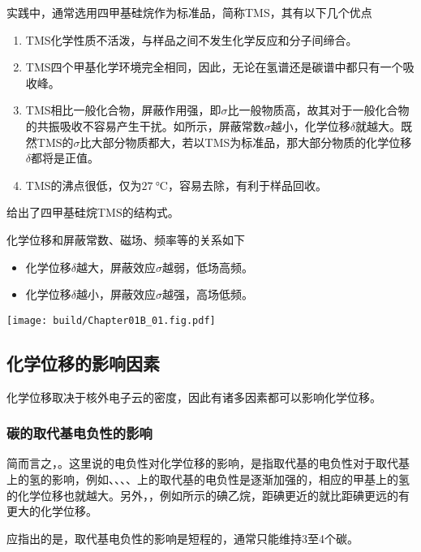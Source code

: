 实践中，通常选用四甲基硅烷作为标准品，简称TMS，其有以下几个优点
\begin{enumerate}
    \item TMS化学性质不活泼，与样品之间不发生化学反应和分子间缔合。
    \item TMS四个甲基化学环境完全相同，因此，无论在氢谱还是碳谱中都只有一个吸收峰。
    \item TMS相比一般化合物，屏蔽作用强，即$\sigma$比一般物质高，故其对于一般化合物的共振吸收不容易产生干扰。如所示，屏蔽常数$\sigma$越小，化学位移$\delta$就越大。既然TMS的$\sigma$比大部分物质都大，若以TMS为标准品，那大部分物质的化学位移$\delta$都将是正值。
    \item TMS的沸点很低，仅为$\SI{27}{\degreeCelsius}$，容易去除，有利于样品回收。
\end{enumerate}\goodbreak

给出了四甲基硅烷TMS的结构式。
\begin{Figure}[四甲基硅烷]
\end{Figure}
化学位移和屏蔽常数、磁场、频率等的关系如下
\begin{itemize}
    \item 化学位移$\delta$越大，屏蔽效应$\sigma$越弱，低场高频。
    \item 化学位移$\delta$越小，屏蔽效应$\sigma$越强，高场低频。
\end{itemize}
\begin{Figure}[化学位移的图像]
    \texttt{[image: build/Chapter01B\_01.fig.pdf]}
\end{Figure}

\subsection{化学位移的影响因素}
化学位移取决于核外电子云的密度，因此有诸多因素都可以影响化学位移。

\subsubsection{碳的取代基电负性的影响}
简而言之，。这里说的电负性对化学位移的影响，是指取代基的电负性对于取代基上的氢的影响，例如、、、、上的取代基的电负性是逐渐加强的，相应的甲基上的氢的化学位移也就越大。另外，，例如所示的碘乙烷，距碘更近的就比距碘更远的有更大的化学位移。
\begin{Figure}[化学位移与电负性的关系]
\end{Figure}
应指出的是，取代基电负性的影响是短程的，通常只能维持3至4个碳。

